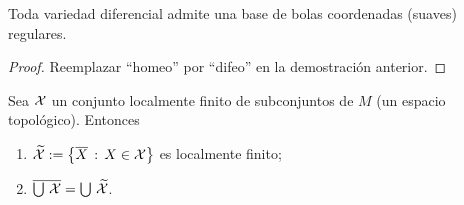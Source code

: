 \begin{lemaBaseDeBolasPrecompactas}[Porisma]%
	\label{lema:basedebolasprecompactas:porisma}
	Toda variedad diferencial admite una base de bolas coordenadas (suaves)
	regulares.
\end{lemaBaseDeBolasPrecompactas}

\begin{proof}
	Reemplazar ``homeo'' por ``difeo'' en la demostraci\'{o}n anterior.
\end{proof}

\begin{lemaConjuntoLocalmenteFinito}\label{lema:conjuntolocalmentefinito}
	Sea $\cal X$ un conjunto localmente finito de subconjuntos de $M$ (un
	espacio topol\'{o}gico). Entonces
	\begin{enumerate}
		\item\label{lema:conjuntolcalmentefinito:clausuras}
			\begin{math}
				\widetilde{\cal X}:=
					\big\{\clos X\,:\,X\in\cal X\big\}
			\end{math} es localmente finito;
		\item\label{lema:conjuntolocalmentefinito:union}
			\begin{math}
				\clos{\bigcup\,\cal X}=
					\bigcup\,\widetilde{\cal X}
			\end{math}.
	\end{enumerate}
\end{lemaConjuntoLocalmenteFinito}

